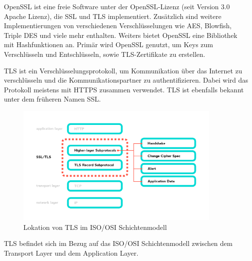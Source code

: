 
OpenSSL ist eine freie Software unter der OpenSSL-Lizenz (seit Version 3.0 Apache Lizenz), die SSL und TLS implementiert. Zusätzlich sind weitere Implementierungen von verschiedenen Verschlüsselungen wie AES, Blowfish, Triple DES und viele mehr enthalten. Weiters bietet OpenSSL eine Bibliothek mit Hashfunktionen an. Primär wird OpenSSL genutzt, um Keys zum Verschlüsseln und Entschlüsseln, sowie TLS-Zertifikate zu erstellen. 



TLS ist ein Verschlüsselungsprotokoll, um Kommunikation über das Internet zu verschlüsseln und die Kommunikationspartner zu authentifizieren. Dabei wird das Protokoll meistens mit HTTPS zusammen verwendet. TLS ist ebenfalls bekannt unter dem früheren Namen SSL.  

\begin{figure}[H]
    \centering
    \includegraphics[width=0.9\textwidth]{media/OpenSSL/info.png}
    \caption{Lokation von TLS im ISO/OSI Schichtenmodell \cite{BreakDownTLS}}
\end{figure}

TLS befindet sich im Bezug auf das ISO/OSI Schichtenmodell zwischen dem Transport Layer und dem Application Layer.


